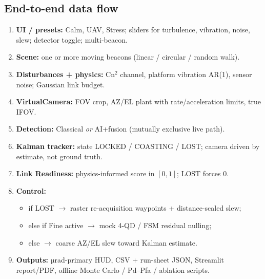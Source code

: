 \documentclass[11pt,a4paper]{article}
\begin{document}
\subsection{End-to-end data flow}
\begin{enumerate}[leftmargin=1.4em]
  \item \textbf{UI / presets:} Calm, UAV, Stress; sliders for turbulence, vibration, noise, slew; detector toggle; multi-beacon.
  \item \textbf{Scene:} one or more moving beacons (linear / circular / random walk).
  \item \textbf{Disturbances + physics:} Cn$^2$ channel, platform vibration AR(1), sensor noise; Gaussian link budget.
  \item \textbf{VirtualCamera:} FOV crop, AZ/EL plant with rate/acceleration limits, true IFOV.
  \item \textbf{Detection:} Classical \emph{or} AI+fusion (mutually exclusive live path).
  \item \textbf{Kalman tracker:} state LOCKED / COASTING / LOST; camera driven by estimate, not ground truth.
  \item \textbf{Link Readiness:} physics-informed score in $[0,1]$; LOST forces 0.
  \item \textbf{Control:}
  \begin{itemize}
    \item if LOST $\rightarrow$ raster re-acquisition waypoints + distance-scaled slew;
    \item else if Fine active $\rightarrow$ mock 4-QD / FSM residual nulling;
    \item else $\rightarrow$ coarse AZ/EL slew toward Kalman estimate.
  \end{itemize}
  \item \textbf{Outputs:} µrad-primary HUD, CSV + run-sheet JSON, Streamlit report/PDF, offline Monte Carlo / Pd--Pfa / ablation scripts.
\end{enumerate}
\end{document}
